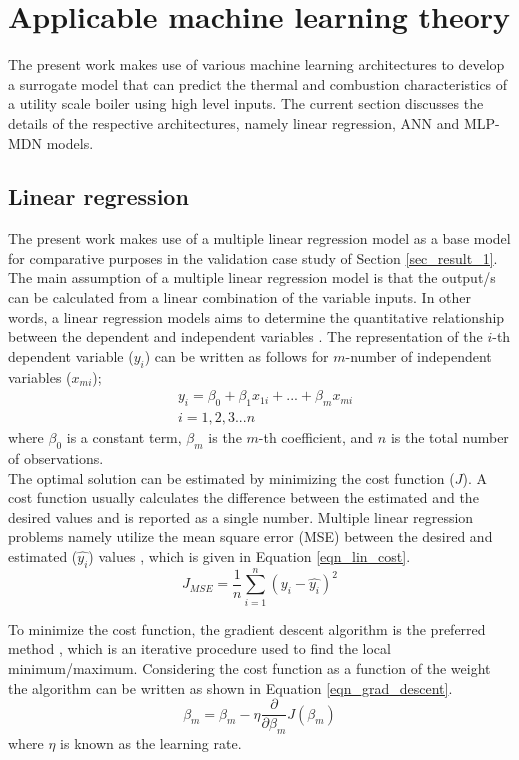 \documentclass[a4paper,fleqn]{cas-dc}
\begin{document}
\section{Applicable machine learning theory}
The present work makes use of various machine learning architectures to develop a surrogate model that can predict the thermal and combustion characteristics of a utility scale boiler using high level inputs. The current section discusses the details of the respective architectures, namely linear regression, ANN and MLP-MDN models.  
\subsection{Linear regression}
The present work makes use of a multiple linear regression model as a base model for comparative purposes in the validation case study of Section \ref{sec_result_1}. The main assumption of a multiple linear regression model is that the output/s can be calculated from a linear combination of the variable inputs. In other words, a linear regression models aims to determine the quantitative relationship between the dependent and independent variables \cite{Wen2022}. The representation of the $i$-th dependent variable ($y_i$) can be written as follows for $m$-number of independent variables ($x_{mi}$);
\begin{equation}
\begin{split}
&y_i = \beta_0+\beta_1 x_{1i}+...+\beta_m x_{mi}\\
&i = 1,2,3...n
\end{split}
\end{equation}
where $\beta_0$ is a constant term, $\beta_{m}$ is the $m$-th coefficient, and $n$ is the total number of observations.\\
 
The optimal solution can be estimated by minimizing the cost function ($J$). A cost function usually calculates the difference between the estimated and the desired values and is reported as a single number. Multiple linear regression problems namely utilize the mean square error (MSE) between the desired and estimated ($\hat{y_i}$)  values \cite{Wheeler2019}, which is given in Equation \ref{eqn_lin_cost}.
 \begin{equation}\label{eqn_lin_cost}
J_{MSE}=\frac{1}{n}\sum^n_{i=1}(y_i-\hat{y_i})^2
\end{equation} 

To minimize the cost function, the gradient descent algorithm is the preferred method \cite{Wen2022}, which is an iterative procedure used to find the local minimum/maximum. Considering the cost function as a function of the weight the algorithm can be written as shown in Equation \ref{eqn_grad_descent}.  
\begin{equation}\label{eqn_grad_descent}
\beta_{m} = \beta_m-\eta\frac{\partial}{\partial\beta_m}J(\beta_m)
\end{equation}
where $\eta$ is known as the learning rate.\\
\end{document}
